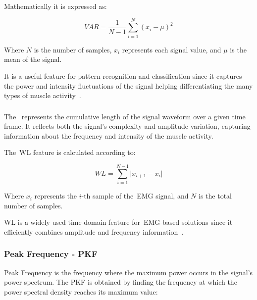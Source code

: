 Mathematically it is expressed as:

\begin{equation}
  VAR = \frac{1}{N - 1} \sum_{i = 1}^{N} (x_i - \mu)^2
  \label{eq:varEQ}
\end{equation}

Where $N$ is the number of samples, $x_i$ represents each signal value, and $\mu$ is the mean of the signal.

It is a useful feature for pattern recognition and classification since it captures the power and intensity fluctuations of the signal helping differentiating the many types of 
muscle activity~\cite{HandGestureRecognition, ComprehensiveStudyOnEMG, Review_IRBM_EMG, ComparativeStudyOfSEMGFeatureEvaluationMethods, EvaluationOfFeatureExtractionAndRecognition, 
EvaluationOfFeatureExtractionAndClassification}.

\subsubsection{}
\label{sssec:waveform_length}

The~ represents the cumulative length of the signal waveform over a given time frame. It reflects both the signal's complexity and amplitude variation, capturing 
information about the frequency and intensity of the muscle activity.

The~\gls{WL} feature is calculated according to:

\begin{equation}
  WL = \sum_{i = 1}^{N - 1} \lvert x_{i + 1} - x_i \rvert
  \label{eq:wlEQ}
\end{equation}

Where $x_i$ represents the $i$-th sample of the~\gls{EMG} signal, and $N$ is the total number of samples.

\gls{WL} is a widely used time-domain feature for~\gls{EMG}-based solutions since it efficiently combines amplitude and frequency information~\cite{HandGestureRecognition, 
ComprehensiveStudyOnEMG, BiomedicalSignalProcessingAndControl, Review_IRBM_EMG, ReviewOfEMGSignalClassification}.

\subsubsection{Peak Frequency - PKF} 
\label{sssec:peak_frequency}

Peak Frequency is the frequency where the maximum power occurs in the signal's power spectrum.
The PKF is obtained by finding the frequency at which the power spectral density reaches its maximum value:

